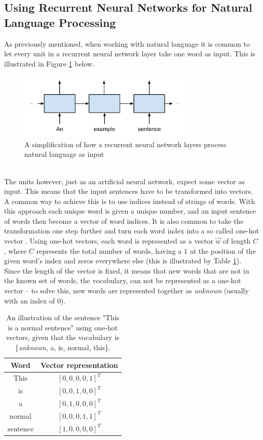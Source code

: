 \subsection{Using Recurrent Neural Networks for Natural Language Processing}\label{sec:rnn_nlp}
As previously mentioned, when working with natural language it is common to let every unit in a recurrent neural network layer take one word as input. This is illustrated in Figure \ref{fig:sentence_to_rnn} below.
\begin{figure}[h]
    \centering
    \includegraphics[width=0.75\textwidth]{figure/ann/sentence_to_rnn}
    \caption{A simplification of how a recurrent neural network layers process natural language as input}
    \label{fig:sentence_to_rnn}
\end{figure}
\\
The units however, just as an artificial neural network, expect some vector as input. This means that the input sentences have to be transformed into vectors. A common way to achieve this is to use indices instead of strings of words. With this approach each unique word is given a unique number, and an input sentence of words then become a vector of word indices. It is also common to take the transformation one step further and turn each word index into a so called one-hot vector \parencite{turian2010word}. Using one-hot vectors, each word is represented as a vector $\vec{w}$ of length $C$, where $C$ represents the total number of words, having a $1$ at the position of the given word's index and zeros everywhere else (this is illustrated by Table \ref{tab:onehot}). Since the length of the vector is fixed, it means that new words that are not in the known set of words, the vocabulary, can not be represented as a one-hot vector -- to solve this, new words are represented together as \textit{unknown} (usually with an index of $0$). 
\begin{table}[h!]
    \centering
    \begin{tabular}{c|c}
    \textbf{Word} & \textbf{Vector representation} \\
    \hline \hline
    This & $[0, 0, 0, 0, 1]^T$ \\ \hline
    is & $[0, 0, 1, 0, 0]^T$ \\ \hline
    a & $[0, 1, 0, 0, 0]^T$ \\ \hline
    normal & $[0, 0, 0, 1, 1]^T$ \\ \hline
    sentence & $[1, 0, 0, 0, 0]^T$ \\ \hline
    \end{tabular}
    \caption{An illustration of the sentence "This is a normal sentence" using one-hot vectors, given that the vocabulary is \{\textit{unknown}, a, is, normal, this\}.}
    \label{tab:onehot}
\end{table} 
